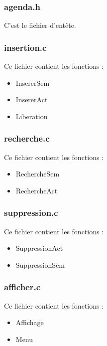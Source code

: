 \documentclass{report}
\newenvironment{myindentpar}[1]%
    {\begin{list}{}%
             {\setlength{\leftmargin}{#1}}%
             \item[]%
     }
     {\end{list}}
\begin{document}
\subsubsection{agenda.h}
C'est le fichier d'entête.

\subsubsection{insertion.c}
Ce fichier contient les fonctions :
\begin{myindentpar}{2cm}
\begin{itemize}
    \item InsererSem
    \item InsererAct
    \item Liberation
\end{itemize}
\end{myindentpar}

\subsubsection{recherche.c}
Ce fichier contient les fonctions :
\begin{myindentpar}{2cm}
\begin{itemize}
    \item RechercheSem
    \item RechercheAct
\end{itemize}
\end{myindentpar}

\subsubsection{suppression.c}
Ce fichier contient les fonctions :
\begin{myindentpar}{2cm}
\begin{itemize}
    \item SuppressionAct
    \item SuppressionSem
\end{itemize}
\end{myindentpar}

\subsubsection{afficher.c}
Ce fichier contient les fonctions :
\begin{myindentpar}{2cm}
\begin{itemize}
    \item Affichage
    \item Menu
\end{itemize}
\end{myindentpar}
\end{document}
